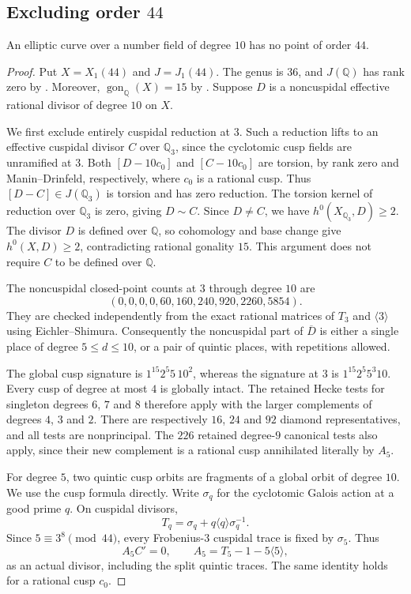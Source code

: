 \subsection{Excluding order $44$}\label{sec:d31a44}
\begin{proposition}\label{prop:decic44-exclusion}
An elliptic curve over a number field of degree $10$ has no point of order $44$.
\end{proposition}
\begin{proof}
Put $X=X_1(44)$ and $J=J_1(44)$.
The genus is $36$, and $J(\mathbb Q)$ has rank zero by
\cite[Theorem~3.1]{DEHMZ}.
Moreover, $\operatorname{gon}_{\mathbb Q}(X)=15$ by
\cite[Theorem~D]{Varivoda26}.
Suppose $D$ is a noncuspidal effective rational divisor of degree $10$ on $X$.

We first exclude entirely cuspidal reduction at $3$.
Such a reduction lifts to an effective cuspidal divisor $C$ over $\mathbb Q_3$,
since the cyclotomic cusp fields are unramified at $3$.
Both $[D-10c_0]$ and $[C-10c_0]$ are torsion, by rank zero and
Manin--Drinfeld, respectively, where $c_0$ is a rational cusp.
Thus $[D-C]\in J(\mathbb Q_3)$ is torsion and has zero reduction.
The torsion kernel of reduction over $\mathbb Q_3$ is zero, giving $D\sim C$.
Since $D\ne C$, we have $h^0(X_{\mathbb Q_3},D)\ge2$.
The divisor $D$ is defined over $\mathbb Q$, so cohomology and base change give
$h^0(X,D)\ge2$, contradicting rational gonality $15$.
This argument does not require $C$ to be defined over $\mathbb Q$.

The noncuspidal closed-point counts at $3$ through degree $10$ are
\[
 (0,0,0,0,60,160,240,920,2260,5854).
\]
They are checked independently from the exact rational matrices of $T_3$
and $\langle3\rangle$ using Eichler--Shimura.
Consequently the noncuspidal part of $\overline D$ is either a single
place of degree $5\le d\le10$, or a pair of quintic places, with repetitions allowed.

The global cusp signature is $1^{15}2^5 5\,10^2$, whereas the signature
at $3$ is $1^{15}2^5 5^3 10$.
Every cusp of degree at most $4$ is globally intact.
The retained Hecke tests for singleton degrees $6$, $7$ and $8$ therefore
apply with the larger complements of degrees $4$, $3$ and $2$.
There are respectively $16$, $24$ and $92$ diamond representatives,
and all tests are nonprincipal.
The $226$ retained degree-$9$ canonical tests also apply, since their
new complement is a rational cusp annihilated literally by $A_5$.

For degree $5$, two quintic cusp orbits are fragments of a global
orbit of degree $10$. We use the cusp formula directly.
Write $\sigma_q$ for the cyclotomic Galois action at a good prime $q$.
On cuspidal divisors,
\[
 T_q=\sigma_q+q\langle q\rangle\sigma_q^{-1}.
\]
Since $5\equiv3^8\pmod {44}$, every Frobenius-$3$ cuspidal trace is fixed by
$\sigma_5$. Thus
\[
 A_5C'=0,\qquad A_5=T_5-1-5\langle5\rangle,
\]
as an actual divisor, including the split quintic traces.
The same identity holds for a rational cusp $c_0$.


\end{proof}

